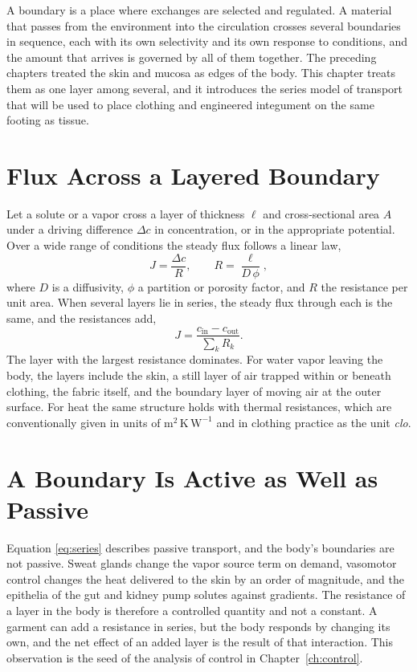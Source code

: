 \documentclass[11pt,openany]{book}
\theoremstyle{definition}
\theoremstyle{remark}
\begin{document}
A boundary is a place where exchanges are selected and regulated. A material that passes from the environment into the circulation crosses several boundaries in sequence, each with its own selectivity and its own response to conditions, and the amount that arrives is governed by all of them together. The preceding chapters treated the skin and mucosa as edges of the body. This chapter treats them as one layer among several, and it introduces the series model of transport that will be used to place clothing and engineered integument on the same footing as tissue.

\section{Flux Across a Layered Boundary}

Let a solute or a vapor cross a layer of thickness $\ell$ and cross-sectional area $A$ under a driving difference $\Delta c$ in concentration, or in the appropriate potential. Over a wide range of conditions the steady flux follows a linear law,
\begin{equation}
J=\frac{\Delta c}{R},\qquad R=\frac{\ell}{D\,\phi},
\label{eq:resist}
\end{equation}
where $D$ is a diffusivity, $\phi$ a partition or porosity factor, and $R$ the resistance per unit area. When several layers lie in series, the steady flux through each is the same, and the resistances add,
\begin{equation}
J=\frac{c_{\mathrm{in}}-c_{\mathrm{out}}}{\sum_k R_k}.
\label{eq:series}
\end{equation}
The layer with the largest resistance dominates. For water vapor leaving the body, the layers include the skin, a still layer of air trapped within or beneath clothing, the fabric itself, and the boundary layer of moving air at the outer surface. For heat the same structure holds with thermal resistances, which are conventionally given in units of $\mathrm{m^2\,K\,W^{-1}}$ and in clothing practice as the unit \emph{clo}.

\section{A Boundary Is Active as Well as Passive}

Equation \eqref{eq:series} describes passive transport, and the body's boundaries are not passive. Sweat glands change the vapor source term on demand, vasomotor control changes the heat delivered to the skin by an order of magnitude, and the epithelia of the gut and kidney pump solutes against gradients. The resistance of a layer in the body is therefore a controlled quantity and not a constant. A garment can add a resistance in series, but the body responds by changing its own, and the net effect of an added layer is the result of that interaction. This observation is the seed of the analysis of control in Chapter~\ref{ch:control}.
\end{document}
